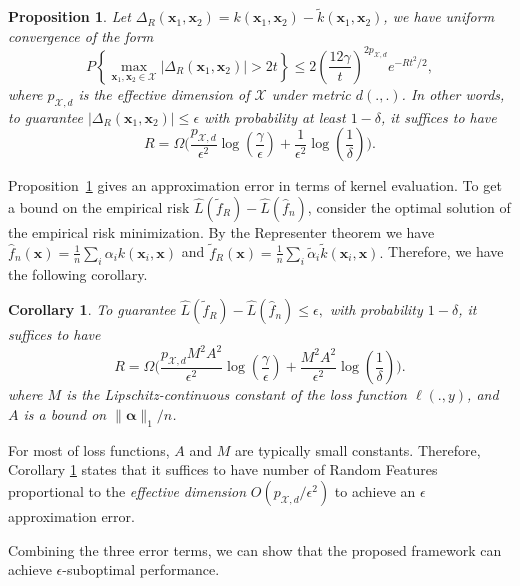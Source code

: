 \documentclass{article}
\newtheorem{corollary}{Corollary}
\newtheorem{proposition}{Proposition}
\newcommand{\X}{\mathcal{X}}
\newcommand{\1}{\mathbf{1}}
\newcommand{\bx}{\boldsymbol{x}}
\newcommand{\hf}{\hat{f}}
\newcommand{\tf}{\tilde{f}}
\newcommand{\tk}{\tilde{k}}
\newcommand{\balpha}{\boldsymbol{\alpha}}
\newcommand{\hL}{\hat{L}}
\newcommand{\talpha}{\tilde{\alpha}}
\begin{document}
\begin{proposition}\label{thm:RF}
Let $\Delta_R(\bx_1,\bx_2)=k(\bx_1,\bx_2)-\tk(\bx_1,\bx_2)$, we have uniform convergence of the form
{\small
\begin{equation*}\label{converge_result}
P\left\{ \max_{\bx_1,\bx_2\in\X} |\Delta_R(\bx_1,\bx_2)| > 2t\right\} \leq 2\left(\frac{12\gamma}{t}\right)^{2p_{\X,d}}e^{-Rt^2/2},
\end{equation*}
}
where $p_{\X,d}$ is the effective dimension of $\X$ under metric $d(.,.)$. In other words, to guarantee $|\Delta_R(\bx_1,\bx_2)|\leq \epsilon$ with probability at least $1-\delta$, it suffices to have
$$
R = \Omega\biggl(\frac{p_{\X,d}}{\epsilon^2}\log(\frac{\gamma}{\epsilon})+\frac{1}{\epsilon^2}\log(\frac{1}{\delta}) \biggr).
$$
\end{proposition}

Proposition~\ref{thm:RF} gives an approximation error in terms of kernel evaluation. To get a bound on the empirical risk $\hL(\tf_R)-\hL(\hf_n)$, consider the optimal solution of the empirical risk minimization. By the Representer theorem we have
$
\hf_n(\bx)=\frac{1}{n}\sum_{i}\alpha_i k(\bx_i,\bx)
$
and
$
\tf_R(\bx)=\frac{1}{n}\sum_{i}\talpha_i \tk(\bx_i,\bx).
$
Therefore, we have the following corollary.

\begin{corollary}\label{cor:obj_bound}
To guarantee 
$
\hL(\tf_R)-\hL(\hf_n) \leq \epsilon, 
$
with probability $1-\delta$, it suffices to have
$$
R = \Omega\biggl(\frac{p_{\X,d}M^2A^2}{\epsilon^2}\log(\frac{\gamma}{\epsilon})+\frac{M^2A^2}{\epsilon^2}\log(\frac{1}{\delta}) \biggr).
$$
where $M$ is the Lipschitz-continuous constant of the loss function $\ell(.,y)$, and $A$ is a bound on $\|\balpha\|_1/n$.

\end{corollary}


For most of loss functions, $A$ and $M$ are typically small constants. Therefore, Corollary \ref{cor:obj_bound} states that it suffices to have number of Random Features proportional to the \emph{effective dimension} $O(p_{\X,d}/\epsilon^2)$ to achieve an $\epsilon$ approximation error. 

Combining the three error terms, we can show that the proposed framework can achieve $\epsilon$-suboptimal performance.
\end{document}
